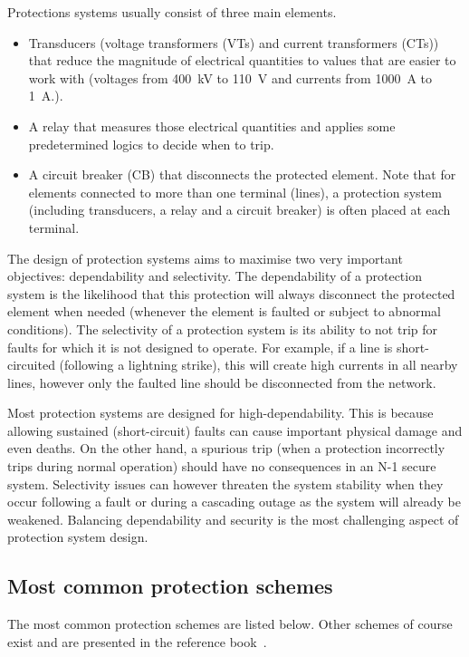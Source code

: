 Protections systems usually consist of three main elements.

\begin{itemize}
    \item Transducers (\ie voltage transformers (VTs) and current transformers (CTs)) that reduce the magnitude of electrical quantities to values that are easier to work with (\eg voltages from 400~kV to 110~V and currents from 1000~A to 1~A.).
    \item A relay that measures those electrical quantities and applies some predetermined logics to decide when to trip.
    \item A circuit breaker (CB) that disconnects the protected element. Note that for elements connected to more than one terminal (\eg lines), a protection system (including transducers, a relay and a circuit breaker) is often placed at each terminal.
\end{itemize}

The design of protection systems aims to maximise two very important objectives: dependability and selectivity. The dependability of a protection system is the likelihood that this protection will always disconnect the protected element when needed (\ie whenever the element is faulted or subject to abnormal conditions). The selectivity of a protection system is its ability to not trip for faults for which it is not designed to operate. For example, if a line is short-circuited (\eg following a lightning strike), this will create high currents in all nearby lines, however only the faulted line should be disconnected from the network.

Most protection systems are designed for high-dependability. This is because allowing sustained (\eg short-circuit) faults can cause important physical damage and even deaths. On the other hand, a spurious trip (\ie when a protection incorrectly trips during normal operation) should have no consequences in an N-1 secure system. Selectivity issues can however threaten the system stability when they occur following a fault or during a cascading outage as the system will already be weakened. Balancing dependability and security is the most challenging aspect of protection system design.

\subsection{Most common protection schemes}

The most common protection schemes are listed below. Other schemes of course exist and are presented in the reference book~\cite{HorowitzBook}.

